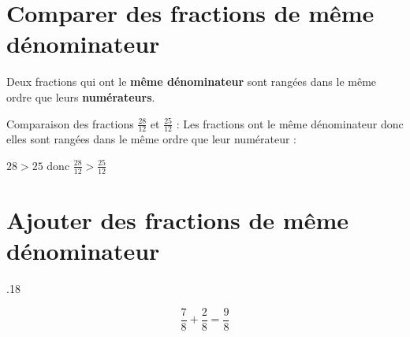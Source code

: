 \begin{pageCours}
\section{Comparer des fractions de même dénominateur}

\begin{Pp}
Deux fractions qui ont le \textbf{même dénominateur} sont rangées dans le même ordre que leurs \textbf{numérateurs}.
\end{Pp}

\begin{Ex}
Comparaison des fractions $\frac{28}{12}$ et $\frac{25}{12}$ :
Les fractions ont le même dénominateur donc elles sont rangées dans le même ordre que leur numérateur :
\begin{center}
$28>25$ donc $\frac{28}{12}>\frac{25}{12}$
\end{center}
\end{Ex}


\section{Ajouter des fractions de même dénominateur}

{.18\linewidth}{
\begin{Ex}
\[\frac{7}{8}+\frac{2}{8}=\frac{9}{8}\]
\end{Ex}}

\end{pageCours}

